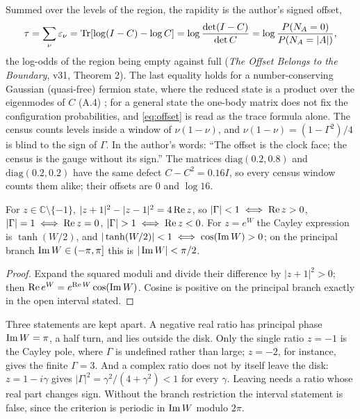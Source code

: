 Summed over the levels of the region, the rapidity is the author's signed offset,
\begin{equation}
\tau=\sum_\nu \varepsilon_\nu=\operatorname{Tr}[\log(I-C)-\log C]=\log\frac{\det(I-C)}{\det C}=\log\frac{P(N_A=0)}{P(N_A=|A|)},
\label{eq:offset}
\end{equation}
the log-odds of the region being empty against full (\emph{The Offset Belongs to the Boundary}, v31, Theorem 2). The last equality holds for a number-conserving Gaussian (quasi-free) fermion state, where the reduced state is a product over the eigenmodes of $C$ (A.4) ; for a general state the one-body matrix does not fix the configuration probabilities, and \eqref{eq:offset} is read as the trace formula alone. The census counts levels inside a window of $\nu(1-\nu)$, and $\nu(1-\nu)=(1-\Gamma^2)/4$ is blind to the sign of $\Gamma$. In the author's words: ``The offset is the clock face; the census is the gauge without its sign.'' The matrices $\mathrm{diag}(0.2,0.8)$ and $\mathrm{diag}(0.2,0.2)$ have the same defect $C-C^2=0.16I$, so every census window counts them alike; their offsets are $0$ and $\log16$.

\begin{theorem}\label{thm:cayley}
For $z\in\mathbb C\setminus\{-1\}$, $|z+1|^2-|z-1|^2=4\operatorname{Re} z$, so $|\Gamma|<1\iff\operatorname{Re} z>0$, $|\Gamma|=1\iff\operatorname{Re} z=0$, $|\Gamma|>1\iff\Rea z<0$. For $z=e^W$ the Cayley expression is $\tanh(W/2)$, and $|\tanh(W/2)|<1\iff\cos(\operatorname{Im} W)>0$; on the principal branch $\operatorname{Im} W\in(-\pi,\pi]$ this is $|\operatorname{Im} W|<\pi/2$. 
\end{theorem}
\begin{proof}
Expand the squared moduli and divide their difference by $|z+1|^2>0$; then $\operatorname{Re} e^W=e^{\operatorname{Re} W}\cos(\operatorname{Im} W)$. Cosine is positive on the principal branch exactly in the open interval stated.
\end{proof}
Three statements are kept apart. A negative real ratio has principal phase $\operatorname{Im} W=\pi$, a half turn, and lies outside the disk. Only the single ratio $z=-1$ is the Cayley pole, where $\Gamma$ is undefined rather than large; $z=-2$, for instance, gives the finite $\Gamma=3$. And a complex ratio does not by itself leave the disk: $z=1-i\gamma$ gives $|\Gamma|^2=\gamma^2/(4+\gamma^2)<1$ for every $\gamma$. Leaving needs a ratio whose real part changes sign. Without the branch restriction the interval statement is false, since the criterion is periodic in $\operatorname{Im} W$ modulo $2\pi$.

